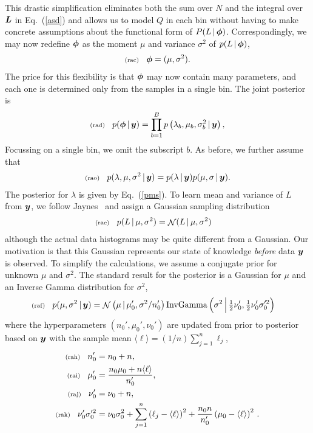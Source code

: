 \documentclass[11pt]{article}
\newcommand{\lleq}[1]{\label{#1} }
\renewcommand{\lleq}[1]{\label{#1} {\scriptstyle {\rm (#1)}} \hspace*{2ex} }
\newcommand{\cond}{\,|\,}
\newcommand{\refeq}[1]{Eq.~(\ref{#1})}
\DeclareMathOperator{\GaussianDist}{\mathcal{N}}
\DeclareMathOperator{\InvGammaDist}{InvGamma}
\newcommand{\Lumtot}{Q}
\newcommand{\Lum}{L}
\newcommand{\lum}{\ell}
\begin{document}
This drastic simplification eliminates both the sum over $N$ and the
integral over ${\bm{L}}$ in \refeq{asd} and allows us to model $\Lumtot$
in each bin without having to make concrete assumptions about the
functional form of $P(\Lum \cond \bmphi)$. Correspondingly, we may now
redefine ${\bm{\phi}}$ as the moment $\mu$ and variance $\sigma^2$ of
$p(L\cond\bmphi)$,
\begin{align}
  \lleq{rac}
  \bmphi =  (\mu, \sigma^2).
\end{align}
The price for this flexibility is that ${\bm{\phi}}$ may now contain many
parameters, and each one is determined only from the samples in a
single bin. The joint posterior is
\begin{align}
  \lleq{rad}
  p(\bmphi \cond \bmy ) = \prod_{b=1}^B p\left(\lambda_b, \mu_b, \sigma^2_b \cond \bmy\right),
\end{align}
Focussing on a single bin, we omit the subscript $b$. As before, we
further assume that
\begin{align}
  \lleq{rao}
p(\lambda, \mu, \sigma^2 \cond \bmy) = p(\lambda \cond \bmy) p(\mu,
\sigma \cond \bmy).
\end{align}
The posterior for $\lambda$ is given by \refeq{pms}.  To learn mean
and variance of $\Lum$ from ${\bm{y}}$, we follow
Jaynes~\cite[Ch. 7.10]{jaynes2003probability} and assign a Gaussian
sampling distribution
\begin{align}
  \lleq{rae}
  p(\Lum \cond \mu, \sigma^2 ) &= \GaussianDist(\Lum \cond \mu, \sigma^2)
\end{align}
although the actual data histograms may be quite different from a
Gaussian. Our motivation is that this Gaussian represents our state of
knowledge \emph{before} data ${\bm{y}}$ is observed. To simplify the
calculations, we assume a conjugate prior for unknown $\mu$ and
$\sigma^2$. The standard result for the posterior is a Gaussian for
$\mu$ and an Inverse Gamma distribution for $\sigma^2$,
\begin{align}
  \lleq{raf}
  p(\mu, \sigma^2 \cond \bmy) 
  &= \GaussianDist\left(\mu \cond \mu_0^\prime, \sigma^2/n_0^\prime\right) %
    \InvGammaDist\left( \sigma^2 \,\Bigl|\, \tfrac{1}{2}\nu_0^\prime, 
    \tfrac{1}{2}\nu_0^\prime \sigma_0^{\prime 2} \right)
\end{align}
where the hyperparameters $(n_0',\mu_0',\nu_0')$ are updated from
prior to posterior based on ${\bm{y}}$ with the sample mean
$\langle\lum\rangle = (1/n) \sum_{j=1}^n \lum_j$,
\begin{align}
  \lleq{rah}  n_0^\prime 
  &= n_0 + n,\\
  \lleq{rai}    \mu_0^\prime 
  &= \frac{n_0 \mu_0 + n \langle\lum\rangle}{n_0^\prime},\\
  \lleq{raj}    \nu_0^\prime 
  &= \nu_0 + n,\\
  \lleq{rak}    
  \nu_0^\prime \sigma_0^{\prime 2} 
  &= \nu_0 \sigma_0^{ 2} 
    + \sum_{j=1}^n \left(\lum_j - \langle\lum\rangle\right)^2 
    + \frac{n_0 n}{n_0^\prime} \left(\mu_0 - \langle\lum\rangle\right)^2\,.
\end{align}
\end{document}
